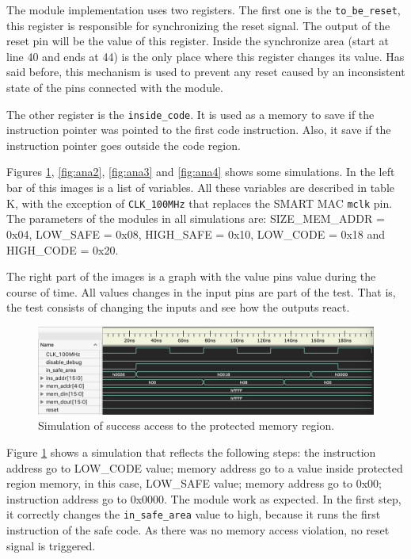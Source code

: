 The module implementation uses two registers. The first one is the \verb|to_be_reset|, this register is responsible for synchronizing the reset signal. The output of the reset pin will be the value of this register.  Inside the synchronize area (start at line 40 and ends at 44) is the only place where this register changes its value.  Has said before, this mechanism is used to prevent any reset caused by an inconsistent state of the pins connected with the module.

The other register is the \verb|inside_code|. It is used as a memory to save if the instruction pointer was pointed to the first code instruction. Also, it save if the instruction pointer goes outside the code region.

Figures \ref{fig:ana1}, \ref{fig:ana2}, \ref{fig:ana3} and \ref{fig:ana4} shows some simulations. In the left bar of this images is a list of variables. All these variables are described in table K, with the exception of \verb|CLK_100MHz| that replaces the SMART MAC \verb|mclk| pin. The parameters of the modules in all simulations are: SIZE\_MEM\_ADDR = 0x04, LOW\_SAFE = 0x08, HIGH\_SAFE = 0x10, LOW\_CODE = 0x18 and HIGH\_CODE = 0x20.

The right part of the images is a graph with the value pins value during the course of time. All values changes in the input pins are part of the test. That is, the test consists of changing the inputs and see how the outputs react. 

\begin{figure}[h]
	\centering
	\includegraphics[width=1\textwidth]{figuras/ana1}
	\caption{Simulation of success access to the protected memory region.}
	\label{fig:ana1}
\end{figure}

Figure \ref{fig:ana1} shows a simulation that reflects the following steps: the instruction address go to  LOW\_CODE value; memory address go to a value inside protected region memory, in this case, LOW\_SAFE value; memory address go to 0x00; instruction address go to 0x0000. The module work as expected. In the first step, it correctly changes the \verb|in_safe_area| value to high, because it runs the first instruction of the safe code. As there was no memory access violation, no reset signal is triggered. 

